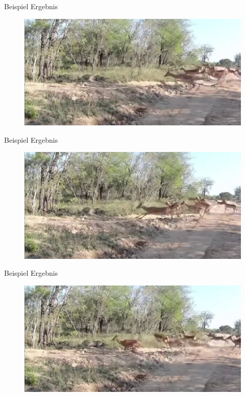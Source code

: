 \documentclass[hyperref={pdfpagelabels=false}]{beamer}
\begin{document}
\begin{frame}[t]{Beispiel Ergebnis}
	\vspace{1.3em}
	\begin{figure}
		\centering
		\includegraphics[width=0.8\linewidth]{Abbildungen/Einstieg/original_small3.jpg}
	\end{figure}
\end{frame}

\begin{frame}[t]{Beispiel Ergebnis}
	\vspace{1.3em}
	\begin{figure}
		\centering
		\includegraphics[width=0.8\linewidth]{Abbildungen/Einstieg/original_small4.jpg}
	\end{figure}
\end{frame}

\begin{frame}[t]{Beispiel Ergebnis}
	\vspace{1.3em}
	\begin{figure}
		\centering
		\includegraphics[width=0.8\linewidth]{Abbildungen/Einstieg/original_small5.jpg}
	\end{figure}
\end{frame}
\end{document}
